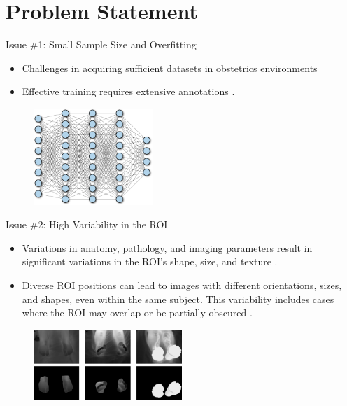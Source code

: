 \documentclass[aspectratio=169]{beamer}
\let\oldcite\cite %
\renewcommand{\cite}[1]{{\tiny\oldcite{#1}}}
\begin{document}
\section{Problem Statement}


\begin{frame}{Issue \#1: Small Sample Size and Overfitting}

\begin{itemize}
\setlength\itemsep{1em}
    \item Challenges in acquiring sufficient datasets in obstetrics environments \cite{WOS:000754419000014, willemink2020preparing}
    \item Effective training requires extensive annotations \cite{sarker2021deep, li2021systematic}.
\end{itemize}

\begin{figure}
    \centering
    \includegraphics[width=0.4\textwidth]{overparametrized.png}
\end{figure}

\end{frame}


\begin{frame}{Issue \#2: High Variability in the ROI}

\begin{itemize}
\setlength\itemsep{1em}
    \item Variations in anatomy, pathology, and imaging parameters result in significant variations in the ROI's shape, size, and texture \cite{li2021systematic}.
    \item Diverse ROI positions can lead to images with different orientations, sizes, and shapes, even within the same subject. This variability includes cases where the ROI may overlap or be partially obscured \cite{arteaga2021segmentation}.
\end{itemize}
     
\begin{figure}
    \centering
    \includegraphics[width=0.5\textwidth]{Figures/high_roi_var.png}

\end{figure}

\end{frame}
\end{document}
